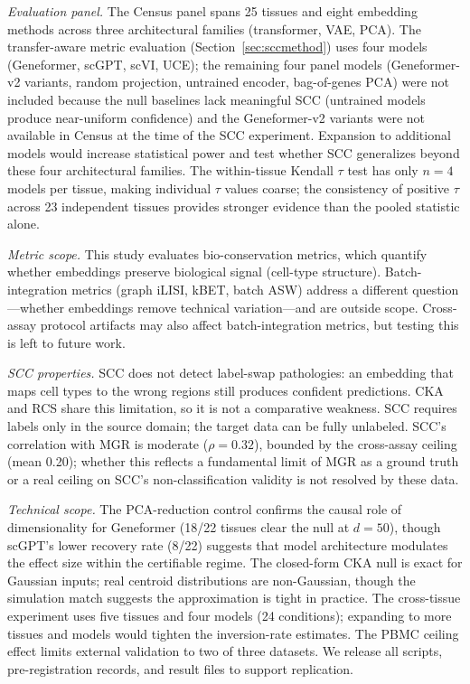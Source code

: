 \documentclass[11pt]{article}
\begin{document}
\emph{Evaluation panel.} The Census panel spans 25 tissues and eight
embedding methods across three architectural families (transformer, VAE,
PCA). The transfer-aware metric evaluation
(Section~\ref{sec:sccmethod}) uses four models (Geneformer, scGPT,
scVI, UCE); the remaining four panel models (Geneformer-v2 variants,
random projection, untrained encoder, bag-of-genes PCA) were not
included because the null baselines lack meaningful SCC (untrained
models produce near-uniform confidence) and the Geneformer-v2 variants
were not available in Census at the time of the SCC experiment.
Expansion to additional models would increase statistical power and
test whether SCC generalizes beyond these four architectural families.
The within-tissue Kendall $\tau$ test has only $n = 4$ models per
tissue, making individual $\tau$ values coarse; the consistency of
positive $\tau$ across 23 independent tissues provides stronger evidence
than the pooled statistic alone.

\emph{Metric scope.} This study evaluates bio-conservation metrics,
which quantify whether embeddings preserve biological signal (cell-type
structure). Batch-integration metrics (graph iLISI, kBET, batch ASW)
address a different question---whether embeddings remove technical
variation---and are outside scope. Cross-assay protocol artifacts may
also affect batch-integration metrics, but testing this is left to
future work.

\emph{SCC properties.} SCC does not detect label-swap pathologies: an
embedding that maps cell types to the wrong regions still produces
confident predictions. CKA and RCS share this limitation, so it is not
a comparative weakness. SCC requires labels only in the source domain;
the target data can be fully unlabeled. SCC's correlation with MGR is
moderate ($\rho = 0.32$), bounded by the cross-assay ceiling (mean
0.20); whether this reflects a fundamental limit of MGR as a ground
truth or a real ceiling on SCC's non-classification validity is not
resolved by these data.

\emph{Technical scope.} The PCA-reduction control confirms the causal
role of dimensionality for Geneformer (18/22 tissues clear the null at
$d = 50$), though scGPT's lower recovery rate (8/22) suggests that
model architecture modulates the effect size within the certifiable
regime. The closed-form CKA null is exact for Gaussian inputs; real
centroid distributions are non-Gaussian, though the simulation match
suggests the approximation is tight in practice. The cross-tissue
experiment uses five tissues and four models (24 conditions); expanding
to more tissues and models would tighten the inversion-rate estimates.
The PBMC ceiling effect limits external validation to two of three
datasets. We release all scripts, pre-registration records, and result
files to support replication.
\end{document}
